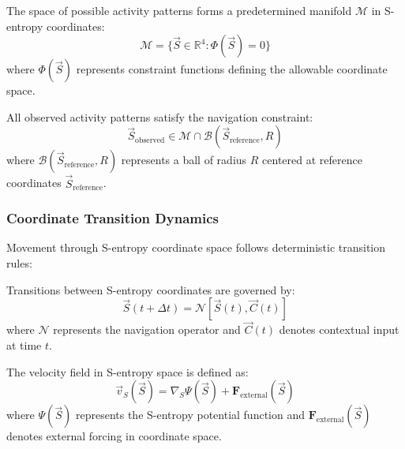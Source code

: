 \begin{definition}
The space of possible activity patterns forms a predetermined manifold $\mathcal{M}$ in S-entropy coordinates:
\begin{equation}
\mathcal{M} = \{\vec{S} \in \mathbb{R}^4 : \Phi(\vec{S}) = 0\}
\end{equation}
where $\Phi(\vec{S})$ represents constraint functions defining the allowable coordinate space.
\end{definition}

\begin{theorem}
All observed activity patterns satisfy the navigation constraint:
\begin{equation}
\vec{S}_{\text{observed}} \in \mathcal{M} \cap \mathcal{B}(\vec{S}_{\text{reference}}, R)
\end{equation}
where $\mathcal{B}(\vec{S}_{\text{reference}}, R)$ represents a ball of radius $R$ centered at reference coordinates $\vec{S}_{\text{reference}}$.
\end{theorem}

\subsubsection{Coordinate Transition Dynamics}

Movement through S-entropy coordinate space follows deterministic transition rules:

\begin{definition}
Transitions between S-entropy coordinates are governed by:
\begin{equation}
\vec{S}(t+\Delta t) = \mathcal{N}[\vec{S}(t), \vec{C}(t)]
\end{equation}
where $\mathcal{N}$ represents the navigation operator and $\vec{C}(t)$ denotes contextual input at time $t$.
\end{definition}

\begin{definition}
The velocity field in S-entropy space is defined as:
\begin{equation}
\vec{v}_S(\vec{S}) = \nabla_S \Psi(\vec{S}) + \mathbf{F}_{\text{external}}(\vec{S})
\end{equation}
where $\Psi(\vec{S})$ represents the S-entropy potential function and $\mathbf{F}_{\text{external}}(\vec{S})$ denotes external forcing in coordinate space.
\end{definition}

